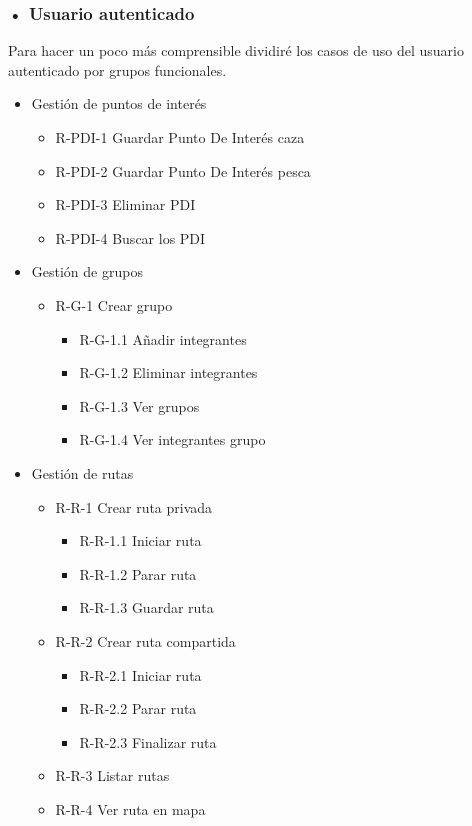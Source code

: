 \subsubsection{• Usuario  autenticado}
Para hacer un poco más comprensible dividiré los casos de uso del usuario autenticado por grupos funcionales.
\begin{itemize}
\item Gestión de puntos de interés
\begin{itemize}
\item R-PDI-1 Guardar Punto De Interés caza
\item R-PDI-2 Guardar Punto De Interés pesca
\item R-PDI-3 Eliminar PDI
\item R-PDI-4 Buscar los PDI
\end{itemize} 
\item Gestión de grupos
\begin{itemize}
\item R-G-1 Crear grupo
\begin{itemize}
\item R-G-1.1 Añadir integrantes
\item R-G-1.2 Eliminar integrantes
\item R-G-1.3 Ver grupos
\item R-G-1.4 Ver integrantes grupo
\end{itemize}

\end{itemize} 


\item Gestión de rutas
\begin{itemize}
\item R-R-1 Crear ruta privada
\begin{itemize}
\item R-R-1.1 Iniciar ruta
\item R-R-1.2 Parar ruta
\item R-R-1.3 Guardar ruta
\end{itemize}

\item R-R-2 Crear ruta compartida
\begin{itemize}
\item R-R-2.1 Iniciar ruta 
\item R-R-2.2 Parar ruta
\item R-R-2.3 Finalizar ruta
\end{itemize}
\item R-R-3 Listar rutas 
\item R-R-4 Ver ruta en mapa
\end{itemize} 
\end{itemize}
